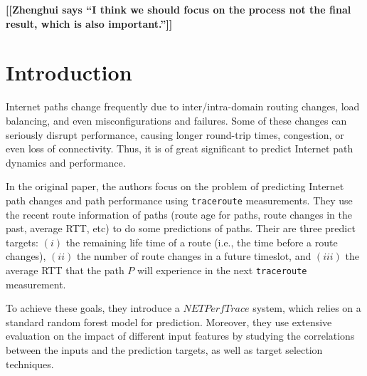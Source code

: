 \documentclass[sigconf]{acmart}
\newcommand{\hui}[1]{{\bf \color{purple} [[Zhenghui says ``#1'']]}}
\begin{document}
	
	
	
	
	\maketitle
	
	\hui{I think we should focus on the process not the final result, which is also important.}
	
	\section{Introduction}
	Internet paths change frequently due to inter/intra-domain routing changes, load balancing, and even misconfigurations and failures\cite{1}.
	Some of these changes can seriously disrupt performance, causing longer round-trip times, congestion, or even loss of connectivity\cite{2}.
	Thus, it is of great significant to predict Internet path dynamics and performance.
	
	In the original paper\cite{oripaper}, the authors focus on the problem of predicting Internet path changes and path performance using \texttt{traceroute} measurements. They use the recent route information of paths (route age for paths, route changes in the past, average RTT, etc) to do some predictions of paths. Their are three predict targets: $(i)$ the remaining life time of a route (i.e., the time before a route changes), $(ii)$ the number of route changes in a future timeslot, and $(iii)$ the average RTT  that the path $P$ will experience in the next \texttt{traceroute} measurement.
	
	To achieve these goals, they introduce a $NETPerfTrace$ system, which relies on a standard random forest model for prediction. Moreover, they use extensive evaluation on the impact of different input features by studying the correlations between the inputs and the prediction targets, as well as target selection techniques.
	
\end{document}
